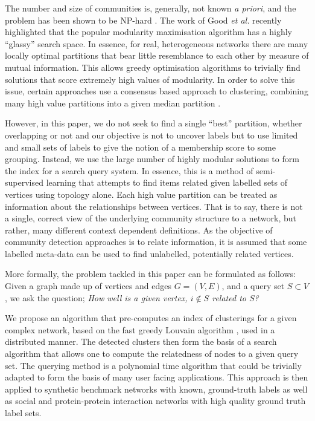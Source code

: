 \documentclass[sigconf]{acmart}
\begin{document}
The number and size of communities is, generally, not known \textit{a priori}, and the problem has been shown to be NP-hard \cite{npHardModularity}.
The work of Good \textit{et al.} \cite{good2010performance} recently highlighted that the popular modularity maximisation algorithm has a highly ``glassy'' search space.
In essence, for real, heterogeneous networks there are many locally optimal partitions that bear little resemblance to each other by measure of mutual information.
This allows greedy optimisation algorithms \cite{blondel2008fast} to trivially find solutions that score extremely high values of modularity.
In order to solve this issue, certain approaches use a consensus based approach to clustering, combining many high value partitions into a given median partition \cite{lancichinetti2012consensus}.

However, in this paper, we do not seek to find a single ``best'' partition, whether overlapping or not and our objective is not to uncover labels but to use limited and small sets of labels to give the notion of a membership score to some grouping.
Instead, we use the large number of highly modular solutions to form the index for a search query system.
In essence, this is a method of semi-supervised learning that attempts to find items related given labelled sets of vertices using topology alone.
Each high value partition can be treated as information about the relationships between vertices.
That is to say, there is not a single, correct view of the underlying community structure to a network, but rather, many different context dependent definitions.
As the objective of community detection approaches is to relate information, it is assumed that some labelled meta-data can be used to find unlabelled, potentially related vertices.

More formally, the problem tackled in this paper can be formulated as follows:
Given a graph made up of vertices and edges $G = (V, E)$, and a query set $S \subset V$, we ask the question; \textit{How well is a given vertex, $i \notin S$ related to $S$?}

We propose an algorithm that pre-computes an index of clusterings for a given complex network, based on the fast greedy Louvain algorithm \cite{blondel2008fast}, used in a distributed manner.
The detected clusters then form the basis of a search algorithm that allows one to compute the relatedness of nodes to a given query set.
The querying method is a polynomial time algorithm that could be trivially adapted to form the basis of many user facing applications.
This approach is then applied to synthetic benchmark networks with known, ground-truth labels as well as social and protein-protein interaction networks with high quality ground truth label sets.
\end{document}
